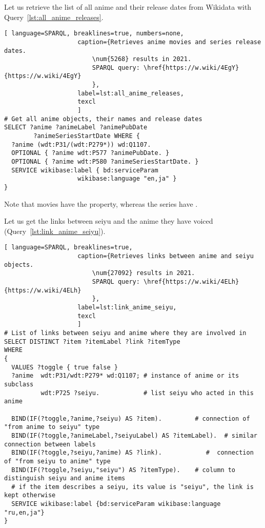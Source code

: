 Let us retrieve the list of all anime and their release dates from Wikidata with Query~\ref{lst:all_anime_releases}.

\begin{lstlisting}[ language=SPARQL, breaklines=true, numbers=none,
                    caption={Retrieves anime movies and series release dates.
                        \num{5268} results in 2021.
                        SPARQL query: \href{https://w.wiki/4EgY}{https://w.wiki/4EgY}
                        },
                    label=lst:all_anime_releases,
                    texcl 
                    ]
# Get all anime objects, their names and release dates
SELECT ?anime ?animeLabel ?animePubDate
		?animeSeriesStartDate WHERE {
  ?anime (wdt:P31/(wdt:P279*)) wd:Q1107.
  OPTIONAL { ?anime wdt:P577 ?animePubDate. }
  OPTIONAL { ?anime wdt:P580 ?animeSeriesStartDate. }
  SERVICE wikibase:label { bd:serviceParam
					wikibase:language "en,ja" }
}
\end{lstlisting}%

Note that movies have the  property, whereas the series have .

Let us get the links between seiyu and the anime they have voiced (Query~\ref{lst:link_anime_seiyu}).

\begin{widepar}%
    \captionsetup[lstlisting]{format=llapwide16}%
%
\begin{lstlisting}[ language=SPARQL, breaklines=true,
                    caption={Retrieves links between anime and seiyu objects.
                        \num{27092} results in 2021.
                        SPARQL query: \href{https://w.wiki/4ELh}{https://w.wiki/4ELh}
                        },
                    label=lst:link_anime_seiyu,
                    texcl 
                    ]
# List of links between seiyu and anime where they are involved in
SELECT DISTINCT ?item ?itemLabel ?link ?itemType
WHERE
{
  VALUES ?toggle { true false }
  ?anime  wdt:P31/wdt:P279* wd:Q1107; # instance of anime or its subclass
          wdt:P725 ?seiyu.            # list seiyu who acted in this anime
  
  BIND(IF(?toggle,?anime,?seiyu) AS ?item).         # connection of "from anime to seiyu" type
  BIND(IF(?toggle,?animeLabel,?seiyuLabel) AS ?itemLabel).  # similar connection between labels
  BIND(IF(?toggle,?seiyu,?anime) AS ?link).            #  connection of "from seiyu to anime" type
  BIND(IF(?toggle,?seiyu,"seiyu") AS ?itemType).    # column to distinguish seiyu and anime items
  # if the item describes a seiyu, its value is "seiyu", the link is kept otherwise
  SERVICE wikibase:label {bd:serviceParam wikibase:language "ru,en,ja"}
}
\end{lstlisting}%
\end{widepar}


